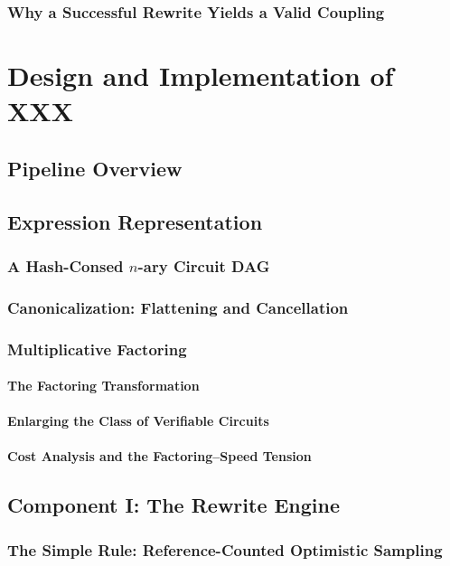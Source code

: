 \documentclass{report}
\begin{document}
  \subsection{Why a Successful Rewrite Yields a Valid Coupling}

\chapter{Design and Implementation of XXX}
\section{Pipeline Overview}
\section{Expression Representation}
  \subsection{A Hash-Consed $n$-ary Circuit DAG}
  \subsection{Canonicalization: Flattening and Cancellation}
  \subsection{Multiplicative Factoring}
    \subsubsection{The Factoring Transformation}
    \subsubsection{Enlarging the Class of Verifiable Circuits}
    \subsubsection{Cost Analysis and the Factoring--Speed Tension}
\section{Component I: The Rewrite Engine}
  \subsection{The Simple Rule: Reference-Counted Optimistic Sampling}
\end{document}
